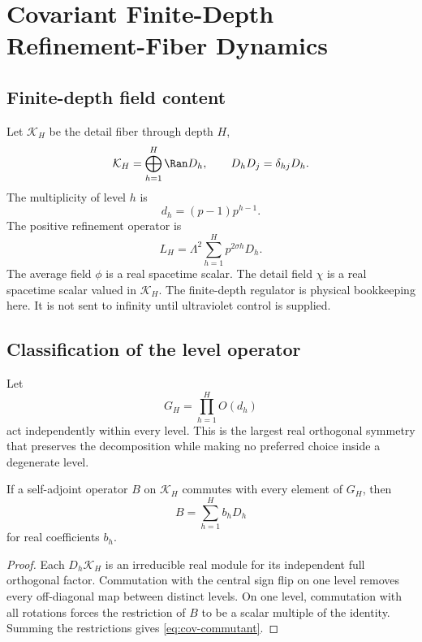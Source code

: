 \chapter{Covariant Finite-Depth Refinement-Fiber Dynamics}
\label{ch:covariant}

\section{Finite-depth field content}

Let $\mathcal K_H$ be the detail fiber through depth $H$,
\begin{equation}
\mathcal K_H=\bigoplus_{h=1}^{H}\Ran D_h,
\qquad
D_hD_j=\delta_{hj}D_h.
\label{eq:cov-fiber}
\end{equation}
The multiplicity of level $h$ is
\begin{equation}
d_h=(p-1)p^{h-1}.
\label{eq:cov-multiplicity}
\end{equation}
The positive refinement operator is
\begin{equation}
L_H=\Lambda^2\sum_{h=1}^{H}p^{2\sigma h}D_h.
\label{eq:cov-LH}
\end{equation}
The average field $\phi$ is a real spacetime scalar.  The detail field $\chi$ is a real spacetime scalar valued in $\mathcal K_H$.  The finite-depth regulator is physical bookkeeping here.  It is not sent to infinity until ultraviolet control is supplied.

\section{Classification of the level operator}

Let
\begin{equation}
G_H=\prod_{h=1}^{H}O(d_h)
\label{eq:cov-level-group}
\end{equation}
act independently within every level.  This is the largest real orthogonal symmetry that preserves the decomposition while making no preferred choice inside a degenerate level.

\begin{theorem}
If a self-adjoint operator $B$ on $\mathcal K_H$ commutes with every element of $G_H$, then
\begin{equation}
B=\sum_{h=1}^{H}b_hD_h
\label{eq:cov-commutant}
\end{equation}
for real coefficients $b_h$.
\end{theorem}

\begin{proof}
Each $D_h\mathcal K_H$ is an irreducible real module for its independent full orthogonal factor.  Commutation with the central sign flip on one level removes every off-diagonal map between distinct levels.  On one level, commutation with all rotations forces the restriction of $B$ to be a scalar multiple of the identity.  Summing the restrictions gives \eqref{eq:cov-commutant}.
\end{proof}

